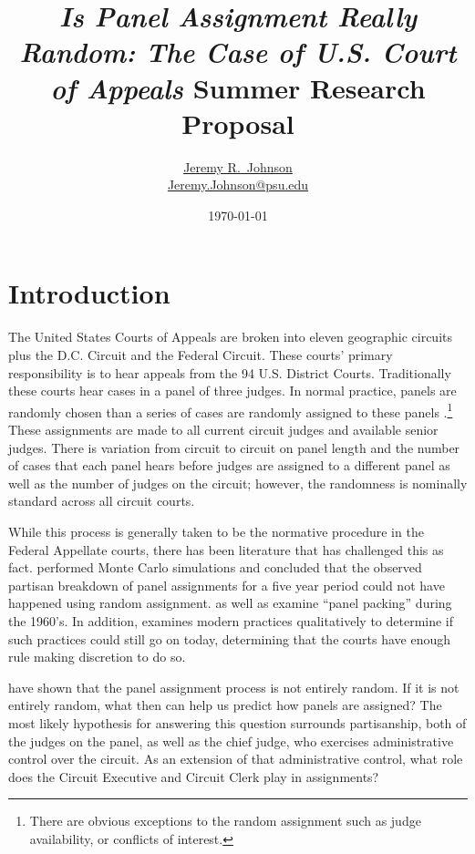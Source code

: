 \documentclass[12pt]{article}
\title{\textit{Is Panel Assignment Really Random: The Case of U.S. Court of Appeals} Summer Research Proposal}
\author{\href{http://www.jeremyrjohnson.org/}{Jeremy R.\ Johnson}\\ \href{mailto:Jeremy.Johnson@psu.edu}{Jeremy.Johnson@psu.edu}}
\affil{Pennsylvania State University}
\date{\today}
\begin{document}
\maketitle
\thispagestyle{empty}
\pagebreak

\singlespacing
\setcounter{page}{1}

\section*{Introduction}
The United States Courts of Appeals are broken into eleven geographic circuits plus the D.C. Circuit and the Federal Circuit.  These courts' primary responsibility is to hear appeals from the 94 U.S. District Courts.  Traditionally these courts hear cases in a panel of three judges.  In normal practice, panels are randomly chosen than a series of cases are randomly assigned to these panels \citep{Hooper2011, Journalist2011,Chilton2014,Songer2007}.\footnote{There are obvious exceptions to the random assignment such as judge availability, or conflicts of interest.}  These assignments are made to all current circuit judges and available senior judges.  There is variation from circuit to circuit on panel length and the number of cases that each panel hears before judges are assigned to a different panel as well as the number of judges on the circuit; however, the randomness is nominally standard across all circuit courts.  

While this process is generally taken to be the normative procedure in the Federal Appellate courts, there has been literature that has challenged this as fact.  \citet{Chilton2014} performed Monte Carlo simulations and concluded that the observed partisan breakdown of panel assignments for a five year period could not have happened using random assignment.  \citet{Atkins1974} as well as \citet{Brown2000} examine ``panel packing'' during the 1960's.  In addition, \citet{Brown2000} examines modern practices qualitatively to determine if such practices could still go on today, determining that the courts have enough rule making discretion to do so.

\citet{Chilton2014} have shown that the panel assignment process is not entirely random.  If it is not entirely random, what then can help us predict how panels are assigned?  The most likely hypothesis for answering this question surrounds partisanship, both of the judges on the panel, as well as the chief judge, who exercises administrative control over the circuit.  As an extension of that administrative control, what role does the Circuit Executive and Circuit Clerk play in assignments?
\end{document}
